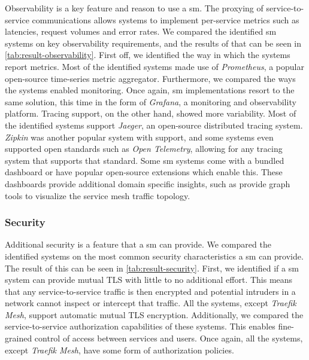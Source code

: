 Observability is a key feature and reason to use a \gls{sm}. The proxying of service-to-service communications allows systems to implement per-service metrics such as latencies, request volumes and error rates. We compared the identified \gls{sm} systems on key observability requirements, and the results of that can be seen in \cref{tab:result-observability}. First off, we identified the way in which the systems report metrics. Most of the identified systems made use of \textit{Prometheus}, a popular open-source time-series metric aggregator.  Furthermore, we compared the ways the systems enabled monitoring. Once again, \gls{sm} implementations resort to the same solution, this time in the form of \textit{Grafana}, a monitoring and observability platform. Tracing support, on the other hand, showed more variability. Most of the identified systems support \textit{Jaeger}, an open-source distributed tracing system. \textit{Zipkin} was another popular system with support, and some systems even supported open standards such as \textit{Open Telemetry}, allowing for any tracing system that supports that standard. Some \gls{sm} systems come with a bundled dashboard or have popular open-source extensions which enable this. These dashboards provide additional domain specific insights, such as provide graph tools to visualize the service mesh traffic topology. 

\subsubsection{Security}
\label{sec:survey:results:comparison:security}



Additional security is a feature that a \gls{sm} can provide. We compared the identified systems on the most common security characteristics a \gls{sm} can provide. The result of this can be seen in \cref{tab:result-security}. First, we identified if a \gls{sm} system can provide mutual TLS with little to no additional effort. This means that any service-to-service traffic is then encrypted and potential intruders in a network cannot inspect or intercept that traffic. All the systems, except \textit{Traefik Mesh}, support automatic mutual TLS encryption. Additionally, we compared the service-to-service authorization capabilities of these systems. This enables fine-grained control of access between services and users. Once again, all the systems, except \textit{Traefik Mesh}, have some form of authorization policies.

